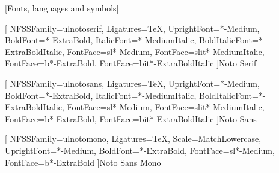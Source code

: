 %
%

[Fonts, languages and symbols]



\newfontfamily{\ulNotoSerifFont}[ %
  NFSSFamily=ulnotoserif,
  Ligatures=TeX,
  UprightFont=*-Medium,
  BoldFont=*-ExtraBold,
  ItalicFont=*-MediumItalic,
  BoldItalicFont=*-ExtraBoldItalic,
  FontFace={sl}{\shapedefault}{*-Medium},
  FontFace={sl}{it}{*-MediumItalic},
  FontFace={b}{\shapedefault}{*-ExtraBold},
  FontFace={b}{it}{*-ExtraBoldItalic}
]{Noto Serif}

\newfontfamily{\ulNotoSansFont}[ %
  NFSSFamily=ulnotosans,
  Ligatures=TeX,
  UprightFont=*-Medium,
  BoldFont=*-ExtraBold,
  ItalicFont=*-MediumItalic,
  BoldItalicFont=*-ExtraBoldItalic,
  FontFace={sl}{\shapedefault}{*-Medium},
  FontFace={sl}{it}{*-MediumItalic},
  FontFace={b}{\shapedefault}{*-ExtraBold},
  FontFace={b}{it}{*-ExtraBoldItalic}
]{Noto Sans}

\newfontfamily{\ulNotoMonoFont}[ %
  NFSSFamily=ulnotomono,
  Ligatures=TeX,
  Scale=MatchLowercase,
  UprightFont=*-Medium,
  BoldFont=*-ExtraBold,
  FontFace={sl}{\shapedefault}{*-Medium},
  FontFace={b}{\shapedefault}{*-ExtraBold}
]{Noto Sans Mono}

